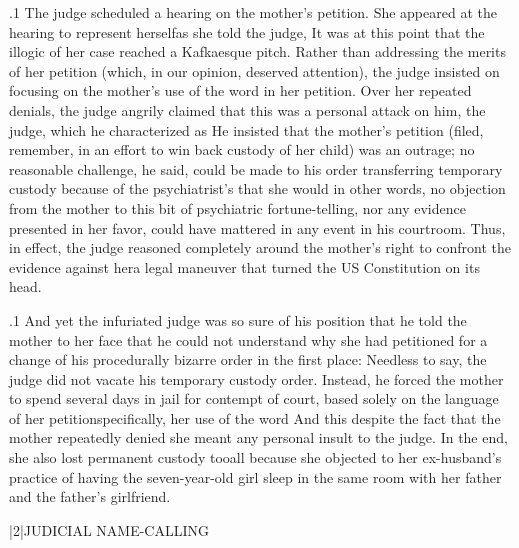 \documentclass[11pt, twoside]{article}
\begin{document}
{\p.1{%
The judge scheduled a hearing on the mother’s petition. She appeared
at the hearing to represent herself\mdash{}as she told the judge,  It was at
this point that the illogic of her case reached a Kafkaesque pitch. Rather
than addressing the merits of her petition (which, in our opinion, deserved attention), the judge insisted on focusing on the mother’s use
of the word  in her petition. Over her repeated denials,
the judge angrily claimed that this was a personal attack on him, the
judge, which he characterized as  He insisted that the mother’s petition (filed, remember, in an effort to win
back custody of her child) was an outrage; no reasonable challenge, he
said, could be made to his order transferring temporary custody because of the psychiatrist’s  that she would \mdash{}in other words, no objection from the mother to this bit
of psychiatric fortune-telling, nor any evidence presented in her favor,
could have mattered in any event in his courtroom. Thus, in effect, the
judge reasoned completely around the mother’s right to
confront the evidence against her\mdash{}a legal maneuver
that turned the US Constitution on its head.
}%

\p.1{%
And yet the infuriated judge was so sure of his position that he told the
mother to her face that he could not understand why she had petitioned
for a change of his procedurally bizarre order in the first place: 
Needless to say, the judge did not vacate his temporary custody order.
Instead, he forced the mother to spend several days in jail for contempt
of court, based solely on the language of her petition\mdash{}specifically, her
use of the word  And this despite the fact that the mother
repeatedly denied she meant any personal insult to the judge. In the
end, she also lost permanent custody too\mdash{}all because she objected to
her ex-husband’s practice of having the seven-year-old girl sleep in the
same room with her father and the father’s girlfriend.
}%


\s|2|{JUDICIAL NAME-CALLING}

}
\end{document}

